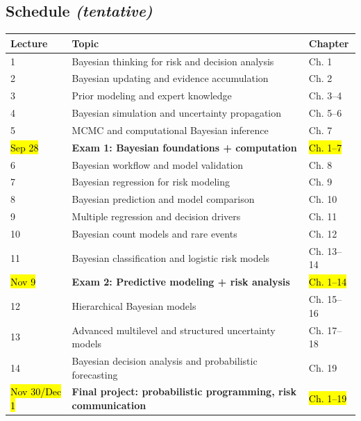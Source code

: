 \documentclass[11pt]{article}
\renewcommand{\arraystretch}{.9}
\begin{document}
\subsection*{Schedule \emph{(tentative)}}
\renewcommand{\arraystretch}{1.025}
\begin{tabular}{l l l}
\hline
\textbf{Lecture}  & \textbf{Topic}                                                        & \textbf{Chapter} \\ \hline
1                 & Bayesian thinking for risk and decision analysis                      & Ch. 1            \\ \hline
2                 & Bayesian updating and evidence accumulation                           & Ch. 2            \\ \hline
3                 & Prior modeling and expert knowledge                                   & Ch. 3--4         \\ \hline
4                 & Bayesian simulation and uncertainty propagation                       & Ch. 5--6         \\ \hline
5                 & MCMC and computational Bayesian inference                             & Ch. 7            \\ \hline
\hl{Sep 28}       & \textbf{Exam 1: Bayesian foundations + computation}                   & \hl{Ch. 1--7}    \\ \hline
6                 & Bayesian workflow and model validation                                & Ch. 8            \\ \hline
7                 & Bayesian regression for risk modeling                                 & Ch. 9            \\ \hline
8                 & Bayesian prediction and model comparison                              & Ch. 10           \\ \hline
9                 & Multiple regression and decision drivers                              & Ch. 11           \\ \hline
10                & Bayesian count models and rare events                                 & Ch. 12           \\ \hline
11                & Bayesian classification and logistic risk models                      & Ch. 13--14       \\ \hline
\hl{Nov 9}        & \textbf{Exam 2: Predictive modeling + risk analysis}                  & \hl{Ch. 1--14}   \\ \hline
12                & Hierarchical Bayesian models                                          & Ch. 15--16       \\ \hline
13                & Advanced multilevel and structured uncertainty models                 & Ch. 17--18       \\ \hline
14                & Bayesian decision analysis and probabilistic forecasting              & Ch. 19           \\ \hline
\hl{Nov 30/Dec 1} & \textbf{Final project: probabilistic programming, risk communication} & \hl{Ch. 1--19}   \\
\hline
\end{tabular}
\end{document}
